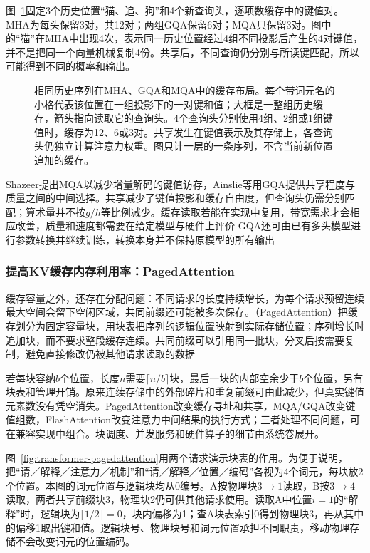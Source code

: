图~\ref{fig:transformer-kv-sharing}固定3个历史位置“猫、追、狗”和4个新查询头，逐项数缓存中的键值对。MHA为每头保留3对，共12对；两组GQA保留6对；MQA只保留3对。图中的“猫”在MHA中出现4次，表示同一历史位置经过4组不同投影后产生的4对键值，并不是把同一个向量机械复制4份。共享后，不同查询仍分别与所读键匹配，所以可能得到不同的概率和输出。

\begin{figure}[p]
  \centering
  
  \caption{相同历史序列在MHA、GQA和MQA中的缓存布局。每个带词元名的小格代表该位置在一组投影下的一对键和值；大框是一整组历史缓存，箭头指向读取它的查询头。4个查询头分别使用4组、2组或1组键值时，缓存为12、6或3对。共享发生在键值表示及其存储上，各查询头仍独立计算注意力权重。图只计一层的一条序列，不含当前新位置追加的缓存。}
  \label{fig:transformer-kv-sharing}
\end{figure}
\FloatBarrier

Shazeer提出MQA以减少增量解码的键值访存，Ainslie等用GQA提供共享程度与质量之间的中间选择。共享减少了键值投影和缓存自由度，但查询头仍需分别匹配；算术量并不按$g/h$等比例减少。缓存读取若能在实现中复用，带宽需求才会相应改善，质量和速度都需要在给定模型与硬件上评价 GQA还可由已有多头模型进行参数转换并继续训练，转换本身并不保持原模型的所有输出

\subsubsection{提高KV缓存内存利用率：PagedAttention}

缓存容量之外，还存在分配问题：不同请求的长度持续增长，为每个请求预留连续最大空间会留下空闲区域，共同前缀还可能被多次保存。（PagedAttention）把缓存划分为固定容量块，用块表把序列的逻辑位置映射到实际存储位置；序列增长时追加块，而不要求整段缓存连续。共同前缀可以引用同一批块，分叉后按需要复制，避免直接修改仍被其他请求读取的数据

若每块容纳$b$个位置，长度$n$需要$\lceil n/b\rceil$块，最后一块的内部空余少于$b$个位置，另有块表和管理开销。原来连续存储中的外部碎片和重复前缀可由此减少，但真实键值元素数没有凭空消失。PagedAttention改变缓存寻址和共享，MQA/GQA改变键值组数，FlashAttention改变注意力中间结果的执行方式；三者处理不同问题，可在兼容实现中组合。块调度、并发服务和硬件算子的细节由系统卷展开。

图~\ref{fig:transformer-pagedattention}用两个请求演示块表的作用。为便于说明，把“请／解释／注意力／机制”和“请／解释／位置／编码”各视为4个词元，每块放2个位置。本图的词元位置与逻辑块均从0编号。A按物理块$3\rightarrow1$读取，B按$3\rightarrow4$读取，两者共享前缀块3，物理块2仍可供其他请求使用。读取A中位置$i=1$的“解释”时，逻辑块为$\lfloor1/2\rfloor=0$，块内偏移为1；查A块表索引0得到物理块3，再从其中的偏移1取出键和值。逻辑块号、物理块号和词元位置承担不同职责，移动物理存储不会改变词元的位置编码。

